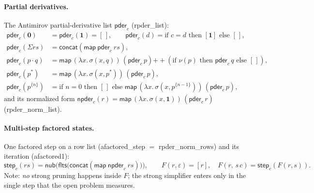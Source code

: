 \documentclass[11pt]{article}
\theoremstyle{remark}
\newcommand{\ZERO}{\mathbf{0}}
\newcommand{\ONE}{\mathbf{1}}
\newcommand{\nub}{\mathsf{nub}}
\newcommand{\flts}{\mathsf{flts}}
\newcommand{\seqnorm}{\sigma}
\newcommand{\pder}{\mathsf{pder}}
\newcommand{\npder}{\mathsf{npder}}
\newcommand{\Fact}{F}
\newcommand{\nullable}{\nu}
\newcommand{\thy}[1]{\textsf{\small #1}}
\begin{document}
\paragraph{Partial derivatives.}
The Antimirov partial-derivative list $\pder_c$ (\thy{rpder\_list}):
\[
\begin{aligned}
\pder_c(\ZERO)&=\pder_c(\ONE)=[\,],\qquad
\pder_c(d)=\text{if } c{=}d \text{ then } [\ONE] \text{ else } [\,],\\
\pder_c(\Sigma rs)&=\mathsf{concat}(\mathsf{map}\ \pder_c\ rs),\\
\pder_c(p\cdot q)&=\mathsf{map}\,(\lambda x.\,\seqnorm(x,q))\,(\pder_c\,p)
  \mathbin{+\!\!+}(\text{if }\nullable(p)\text{ then }\pder_c\,q\text{ else }[\,]),\\
\pder_c(p^{*})&=\mathsf{map}\,(\lambda x.\,\seqnorm(x,p^{*}))\,(\pder_c\,p),\\
\pder_c(p^{\{n\}})&=\text{if } n{=}0 \text{ then } [\,] \text{ else }
  \mathsf{map}\,(\lambda x.\,\seqnorm(x,p^{\{n-1\}}))\,(\pder_c\,p),
\end{aligned}
\]
and its normalized form
$\npder_c(r)=\mathsf{map}\,(\lambda x.\,\seqnorm(x,\ONE))\,(\pder_c\,r)$
(\thy{rpder\_norm\_list}).

\paragraph{Multi-step factored states.}
One factored step on a row list (\thy{afactored\_step} $=$
\thy{rpder\_norm\_rows}) and its iteration (\thy{afactored1}):
\[
\mathsf{step}_c(rs)=\nub\bigl(\flts\bigl(\mathsf{concat}
   (\mathsf{map}\ \npder_c\ rs)\bigr)\bigr),
\qquad
\Fact(r,\varepsilon)=[r],\quad
\Fact(r,\,s\,c)=\mathsf{step}_c(\Fact(r,s)).
\]
Note: \emph{no} strong pruning happens inside $\Fact$; the strong simplifier
enters only in the single step that the open problem measures.
\end{document}
